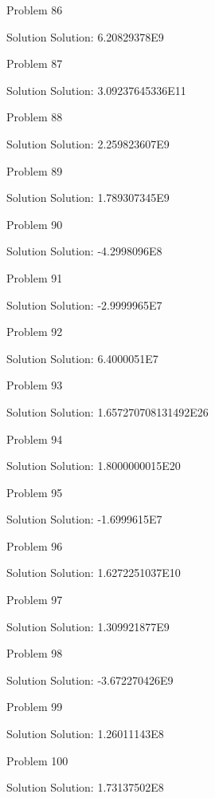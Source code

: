 \documentclass{article}
\begin{document}
Problem 86

Solution Solution: 6.20829378E9

Problem 87

Solution Solution: 3.09237645336E11

Problem 88

Solution Solution: 2.259823607E9

Problem 89

Solution Solution: 1.789307345E9

Problem 90

Solution Solution: -4.2998096E8

Problem 91

Solution Solution: -2.9999965E7

Problem 92

Solution Solution: 6.4000051E7

Problem 93

Solution Solution: 1.657270708131492E26

Problem 94

Solution Solution: 1.8000000015E20

Problem 95

Solution Solution: -1.6999615E7

Problem 96

Solution Solution: 1.6272251037E10

Problem 97

Solution Solution: 1.309921877E9

Problem 98

Solution Solution: -3.672270426E9

Problem 99

Solution Solution: 1.26011143E8

Problem 100

Solution Solution: 1.73137502E8
\end{document}
